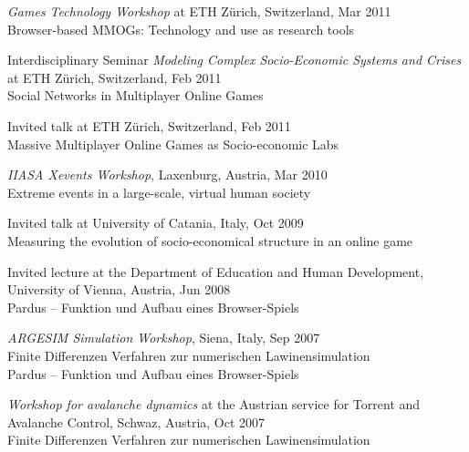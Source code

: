 \documentclass[10pt,a4paper]{article}
\renewenvironment{itemize}{
  \begin{list}{}{
    \setlength{\leftmargin}{1.5em}
    \setlength{\itemsep}{0.25em}
    \setlength{\parskip}{0pt}
    \setlength{\parsep}{0.25em}
  }
}{
  \end{list}
}
\begin{document}
\begin{itemize}
\item{\emph{Games Technology Workshop} at ETH Z{\"u}rich, Switzerland, Mar 2011\\{Browser-based MMOGs: Technology and use as research tools}}
\item{Interdisciplinary Seminar \emph{Modeling Complex Socio-Economic Systems and Crises} at ETH Z{\"u}rich, Switzerland, Feb 2011\\ {Social Networks in Multiplayer Online Games}}
\item{Invited talk at ETH Z{\"u}rich, Switzerland, Feb 2011\\ {Massive Multiplayer Online Games as Socio-economic Labs}}
\item{\emph{IIASA Xevents Workshop}, Laxenburg, Austria, Mar 2010\\ {Extreme events in a large-scale, virtual human society}}
\item{Invited talk at University of Catania, Italy, Oct 2009\\ {Measuring the evolution of socio-economical structure in an online game}}
\item{Invited lecture at the Department of Education and Human Development, University of Vienna, Austria, Jun 2008\\ {Pardus -- Funktion und Aufbau eines Browser-Spiels}}
\item{\emph{ARGESIM Simulation Workshop}, Siena, Italy, Sep 2007\\ {Finite Differenzen Verfahren zur numerischen Lawinensimulation}\\ {Pardus -- Funktion und Aufbau eines Browser-Spiels}}
\item{\emph{Workshop for avalanche dynamics} at the Austrian service for Torrent and Avalanche Control, Schwaz, Austria, Oct 2007\\ {Finite Differenzen Verfahren zur numerischen Lawinensimulation}}
\end{itemize}
\end{document}
